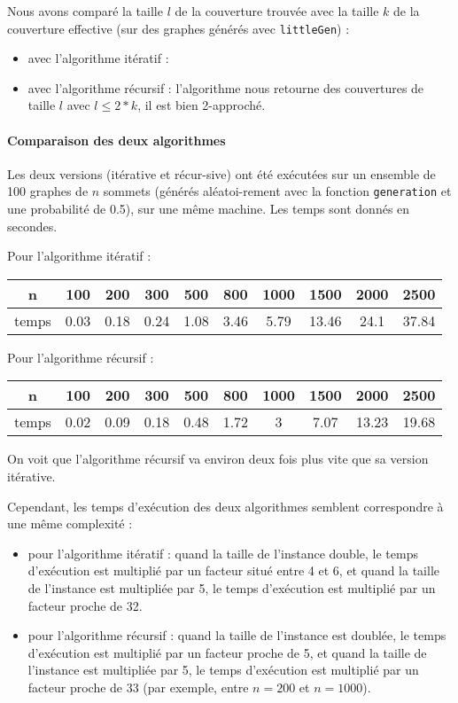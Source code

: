 \documentclass[a4paper,10pt]{article}
\begin{document}
Nous avons comparé la taille $l$ de la couverture trouvée avec la taille $k$ de la couverture effective (sur des graphes générés avec \texttt{littleGen}) :
\begin{itemize}
\item avec l'algorithme itératif :
\item avec l'algorithme récursif : l'algorithme nous retourne des couvertures de taille $l$ avec $l \leq 2*k$, il est bien 2-approché.
\end{itemize}

\paragraph{Comparaison des deux algorithmes}

Les deux versions (itérative et récur-sive) ont été exécutées sur un ensemble de 100 graphes de $n$ sommets (générés aléatoi-rement avec la fonction \texttt{generation} et une probabilité de 0.5), sur une même machine.
Les temps sont donnés en secondes.

Pour l'algorithme itératif :
\begin{center}
\begin{tabular}{|c|c|c|c|c|c|c|c|c|c|}
	\hline 
	n & 100 & 200 & 300 & 500 & 800 & 1000 & 1500 & 2000 & 2500 \\
	\hline
	temps & 0.03 & 0.18 & 0.24 & 1.08 & 3.46 & 5.79 & 13.46 & 24.1 & 37.84 \\
	\hline
\end{tabular}
\end{center}

Pour l'algorithme récursif :
\begin{center}
\begin{tabular}{|c|c|c|c|c|c|c|c|c|c|}
	\hline 
	n & 100 & 200 & 300 & 500 & 800 & 1000 & 1500 & 2000 & 2500 \\
	\hline
	temps & 0.02 & 0.09 & 0.18 & 0.48 & 1.72 & 3 & 7.07 & 13.23 & 19.68\\
	\hline
\end{tabular}
\end{center}

On voit que l'algorithme récursif va environ deux fois plus vite que sa version itérative.

Cependant, les temps d'exécution des deux algorithmes semblent correspondre à une même complexité : 
\begin{itemize}
\item pour l'algorithme itératif : quand la taille de l'instance double, le temps d'exécution est multiplié par un facteur situé entre 4 et 6, et quand la taille de l'instance est multipliée par 5, le temps d'exécution est multiplié par un facteur proche de 32.
\item pour l'algorithme récursif : quand la taille de l'instance est doublée, le temps d'exécution est multiplié par un facteur proche de 5, et quand la taille de l'instance est multipliée par 5, le temps d'exécution est multiplié par un facteur proche de 33 (par exemple, entre $n = 200$ et $n = 1000$).
\end{itemize}
\end{document}
